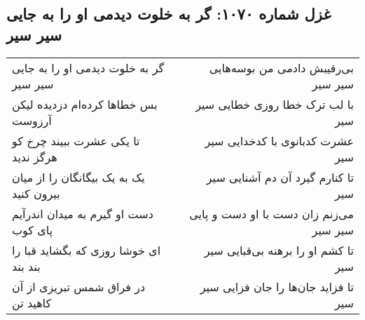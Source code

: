 \begin{center}
\section*{غزل شماره ۱۰۷۰: گر به خلوت دیدمی او را به جایی سیر سیر}
\label{sec:1070}
\begin{longtable}{l p{0.5cm} r}
گر به خلوت دیدمی او را به جایی سیر سیر
&&
بی‌رقیبش دادمی من بوسه‌هایی سیر سیر
\\
بس خطاها کرده‌ام دزدیده لیکن آرزوست
&&
با لب ترک خطا روزی خطایی سیر سیر
\\
تا یکی عشرت ببیند چرخ کو هرگز ندید
&&
عشرت کدبانوی با کدخدایی سیر سیر
\\
یک به یک بیگانگان را از میان بیرون کنید
&&
تا کنارم گیرد آن دم آشنایی سیر سیر
\\
دست او گیرم به میدان اندرآیم پای کوب
&&
می‌زنم زان دست با او دست و پایی سیر سیر
\\
ای خوشا روزی که بگشاید قبا را بند بند
&&
تا کشم او را برهنه بی‌قبایی سیر سیر
\\
در فراق شمس تبریزی از آن کاهید تن
&&
تا فزاید جان‌ها را جان فزایی سیر سیر
\\
\end{longtable}
\end{center}

